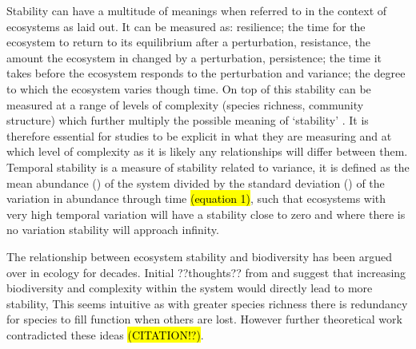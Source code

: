 Stability can have a multitude of meanings when referred to in the context of ecosystems as \cite{Pimm1984} laid out. It can be measured as: resilience; the time for the ecosystem to return to its equilibrium after a perturbation, resistance, the amount the ecosystem in changed by a perturbation, persistence; the time it takes before the ecosystem responds to the perturbation and variance; the degree to which the ecosystem varies though time. On top of this stability can be measured at a range of levels of complexity (species richness, community structure) which further multiply the possible meaning of ‘stability’ \cite{Pimm1984,Lehman2000}.  It is therefore essential for studies to be explicit in what they are measuring and at which level of complexity as it is likely any relationships will differ between them. Temporal stability \citep{Tilman1999, Lehman2000} is a measure of stability related to variance, it is defined as the mean abundance (\mu) of the system divided by the standard deviation (\sigma) of the variation in abundance through time \hl{(equation 1)}, such that ecosystems with very high temporal variation will have a stability close to zero and where there is no variation stability will approach infinity. 

The relationship between ecosystem stability and biodiversity has been argued over in ecology for decades. Initial ??thoughts?? from \cite{Elton1958} and \cite{MacArthur1955} suggest that increasing biodiversity and complexity within the system would directly lead to more stability, This seems intuitive as with greater species richness there is redundancy for species to fill function when others are lost. However further theoretical work contradicted these ideas \hl{(CITATION!?)}.  